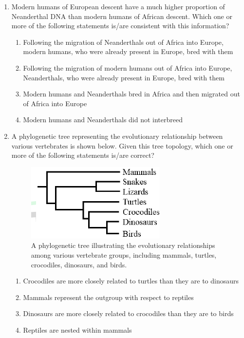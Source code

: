 \documentclass[journal]{IEEEtran}
\begin{document}
\begin{enumerate}
    \item Modern humans of European descent have a much higher proportion of Neanderthal DNA than modern humans of African descent.
Which one or more of the following statements is/are consistent with this information?
\begin{enumerate}
        \item Following the migration of Neanderthals out of Africa into Europe, modern humans, who were already present in Europe, bred with them
        \item Following the migration of modern humans out of Africa into Europe, Neanderthals, who were already present in Europe, bred with them
        \item Modern humans and Neanderthals bred in Africa and then migrated out of Africa into Europe
        \item Modern humans and Neanderthals did not interbreed
    
\end{enumerate}
    
    \item A phylogenetic tree representing the evolutionary relationship between various vertebrates is shown below.
Given this tree topology, which one or more of the following statements is/are correct?
\begin{figure}[!h]
        \centering
        \includegraphics[width=0.4\columnwidth]{figs/Q.62.png}
        \caption{A phylogenetic tree illustrating the evolutionary relationships among various vertebrate groups, including mammals, turtles, crocodiles, dinosaurs, and birds.}
        \label{fig:Q.62}
    \end{figure}
    \begin{enumerate}
        \item Crocodiles are more closely related to turtles than they are to dinosaurs
        \item Mammals represent the outgroup with respect to reptiles
        \item Dinosaurs are more closely related to crocodiles than they are to birds
        \item Reptiles are nested within mammals
    \end{enumerate}
   

\end{enumerate}
\end{document}
